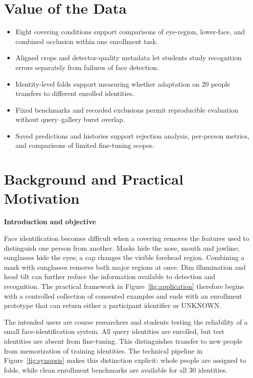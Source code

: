 \documentclass[11pt,a4paper]{article}
\newcommand{\cont}[1]{\par{\sffamily\bfseries #1}\par}
\newcommand{\nextpage}{\clearpage}
\begin{document}
\section{Value of the Data}
\begin{itemize}
\item Eight covering conditions support comparisons of eye-region, lower-face, and combined occlusion within one enrollment task.
\item Aligned crops and detector-quality metadata let students study recognition errors separately from failures of face detection.
\item Identity-level folds support measuring whether adaptation on 20 people transfers to different enrolled identities.
\item Fixed benchmarks and recorded exclusions permit reproducible evaluation without query--gallery burst overlap.
\item Saved predictions and histories support rejection analysis, per-person metrics, and comparisons of limited fine-tuning scopes.
\end{itemize}

\nextpage
\section{Background and Practical Motivation}
\cont{Introduction and objective}
Face identification becomes difficult when a covering removes the features used to distinguish one person from another. Masks hide the nose, mouth and jawline; sunglasses hide the eyes; a cap changes the visible forehead region. Combining a mask with sunglasses removes both major regions at once. Dim illumination and head tilt can further reduce the information available to detection and recognition. The practical framework in Figure~\ref{fig:application} therefore begins with a controlled collection of consented examples and ends with an enrollment prototype that can return either a participant identifier or UNKNOWN.

The intended users are course researchers and students testing the reliability of a small face-identification system. All query identities are enrolled, but test identities are absent from fine-tuning. This distinguishes transfer to new people from memorization of training identities. The technical pipeline in Figure~\ref{fig:synopsis} makes this distinction explicit: whole people are assigned to folds, while clean enrollment benchmarks are available for all 30 identities.
\end{document}
